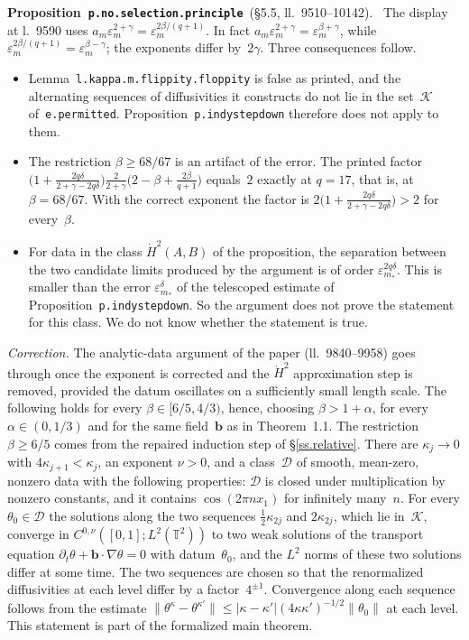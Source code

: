 \documentclass[11pt]{amsart}
\newcommand{\ep}{\varepsilon}
\newcommand{\TT}{\mathbb{T}}
\newcommand{\Ln}[1]{l.~#1}
\newcommand{\Lns}[1]{ll.~#1}
\newcommand{\lab}[1]{\texttt{#1}}
\newcommand{\nf}[2]{\nicefrac{#1}{#2}}
\providecommand{\nicefrac}[2]{#1/#2}
\theoremstyle{remark}
\newenvironment{erratum}[2]{\par\smallskip\noindent\textbf{#1}\ {\small(#2)}.\ }{\par}
\begin{document}
\begin{erratum}{Proposition~\lab{p.no.selection.principle}}{\S5.5, \Lns{9510--10142}}
The display at \Ln{9590} uses $a_m\ep_m^{2+\gamma}=\ep_m^{2\beta/(q+1)}$. In fact $a_m\ep_m^{2+\gamma}=\ep_m^{\beta+\gamma}$, while $\ep_m^{2\beta/(q+1)}=\ep_m^{\beta-\gamma}$; the exponents differ by~$2\gamma$. Three consequences follow.
\begin{itemize}
\item Lemma~\lab{l.kappa.m.flippity.floppity} is false as printed, and the alternating sequences of diffusivities it constructs do not lie in the set~$\mathcal K$ of~\lab{e.permitted}. Proposition~\lab{p.indystepdown} therefore does not apply to them.
\item The restriction $\beta\geq\nf{68}{67}$ is an artifact of the error. The printed factor $\bigl(1+\frac{2q\delta}{2+\gamma-2q\delta}\bigr)\frac{2}{2+\gamma}\bigl(2-\beta+\frac{2\beta}{q+1}\bigr)$ equals~$2$ exactly at $q=17$, that is, at $\beta=\nf{68}{67}$. With the correct exponent the factor is $2\bigl(1+\frac{2q\delta}{2+\gamma-2q\delta}\bigr)>2$ for every~$\beta$.
\item For data in the class $\dot H^2(A,B)$ of the proposition, the separation between the two candidate limits produced by the argument is of order $\ep_{m_*}^{2q\delta}$. This is smaller than the error $\ep_{m_*}^{\delta}$ of the telescoped estimate of Proposition~\lab{p.indystepdown}. So the argument does not prove the statement for this class. We do not know whether the statement is true.
\end{itemize}
\emph{Correction.} The analytic-data argument of the paper (\Lns{9840--9958}) goes through once the exponent is corrected and the $\dot H^2$ approximation step is removed, provided the datum oscillates on a sufficiently small length scale. The following holds for every $\beta\in[\nf65,\nf43)$, hence, choosing $\beta>1+\alpha$, for every $\alpha\in(0,\nf13)$ and for the same field~$\mathbf b$ as in Theorem~1.1. The restriction $\beta\geq\nf65$ comes from the repaired induction step of \S\ref{ss.relative}. There are $\kappa_j\to0$ with $4\kappa_{j+1}<\kappa_j$, an exponent $\nu>0$, and a class~$\mathcal D$ of smooth, mean-zero, nonzero data with the following properties: $\mathcal D$ is closed under multiplication by nonzero constants, and it contains $\cos(2\pi nx_1)$ for infinitely many~$n$. For every $\theta_0\in\mathcal D$ the solutions along the two sequences $\frac12\kappa_{2j}$ and $2\kappa_{2j}$, which lie in~$\mathcal K$, converge in $C^{0,\nu}([0,1];L^2(\TT^2))$ to two weak solutions of the transport equation $\partial_t\theta+\mathbf b\cdot\nabla\theta=0$ with datum~$\theta_0$, and the $L^2$ norms of these two solutions differ at some time. The two sequences are chosen so that the renormalized diffusivities at each level differ by a factor~$4^{\pm1}$. Convergence along each sequence follows from the estimate $\|\theta^\kappa-\theta^{\kappa'}\|\leq|\kappa-\kappa'|(4\kappa\kappa')^{-1/2}\|\theta_0\|$ at each level. This statement is part of the formalized main theorem.
\end{erratum}
\end{document}
